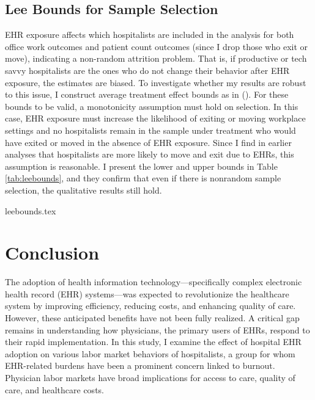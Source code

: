 \documentclass[12pt]{article}
\begin{document}
\subsection{Lee Bounds for Sample Selection}

EHR exposure affects which hospitalists are included in the analysis for both office work outcomes and patient count outcomes (since I drop those who exit or move), indicating a non-random attrition problem. That is, if productive or tech savvy hospitalists are the ones who do not change their behavior after EHR exposure, the estimates are biased. To investigate whether my results are robust to this issue, I construct average treatment effect bounds as in  \citeauthor{lee2009training} (\citeyear{lee2009training}). For these bounds to be valid, a monotonicity assumption must hold on selection. In this case, EHR exposure must increase the likelihood of exiting or moving workplace settings and no hospitalists remain in the sample under treatment who would have exited or moved in the absence of EHR exposure. Since I find in earlier analyses that hospitalists are more likely to move and exit due to EHRs, this assumption is reasonable. I present the lower and upper bounds in Table \ref{tab:leebounds}, and they confirm that even if there is nonrandom sample selection, the qualitative results still hold. 

{leebounds.tex}

\section{Conclusion}

The adoption of health information technology—specifically complex electronic health record (EHR) systems—was expected to revolutionize the healthcare system by improving efficiency, reducing costs, and enhancing quality of care. However, these anticipated benefits have not been fully realized. A critical gap remains in understanding how physicians, the primary users of EHRs, respond to their rapid implementation. In this study, I examine the effect of hospital EHR adoption on various labor market behaviors of hospitalists, a group for whom EHR-related burdens have been a prominent concern linked to burnout. Physician labor markets have broad implications for access to care, quality of care, and healthcare costs.
\end{document}
